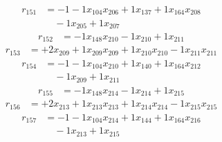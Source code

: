 \[\begin{aligned}
r_{151} &= - 1 - 1 x_{104} x_{206} + 1 x_{137} + 1 x_{164} x_{208} \\
 &\quad - 1 x_{205} + 1 x_{207}
\end{aligned}\]
\[\begin{aligned}
r_{152} &= - 1 x_{148} x_{210} - 1 x_{210} + 1 x_{211}
\end{aligned}\]
\[\begin{aligned}
r_{153} &= + 2 x_{209} + 1 x_{209} x_{209} + 1 x_{210} x_{210} - 1 x_{211} x_{211}
\end{aligned}\]
\[\begin{aligned}
r_{154} &= - 1 - 1 x_{104} x_{210} + 1 x_{140} + 1 x_{164} x_{212} \\
 &\quad - 1 x_{209} + 1 x_{211}
\end{aligned}\]
\[\begin{aligned}
r_{155} &= - 1 x_{148} x_{214} - 1 x_{214} + 1 x_{215}
\end{aligned}\]
\[\begin{aligned}
r_{156} &= + 2 x_{213} + 1 x_{213} x_{213} + 1 x_{214} x_{214} - 1 x_{215} x_{215}
\end{aligned}\]
\[\begin{aligned}
r_{157} &= - 1 - 1 x_{104} x_{214} + 1 x_{144} + 1 x_{164} x_{216} \\
 &\quad - 1 x_{213} + 1 x_{215}
\end{aligned}\]
